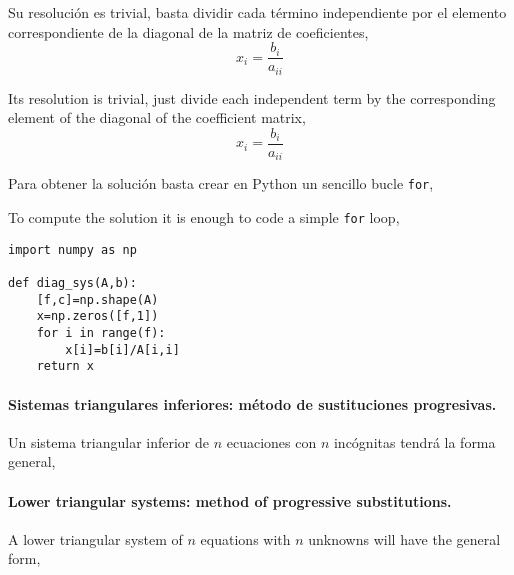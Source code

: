 \begin{paracol}{2}
Su resolución es trivial, basta dividir cada término independiente por el elemento correspondiente de la diagonal de la matriz de coeficientes,
\begin{equation*}
x_i=\frac{b_i}{a_{ii}}
\end{equation*}

\switchcolumn
Its resolution is trivial, just divide each independent term by the corresponding element of the diagonal of the coefficient matrix,
\begin{equation*}
x_i=\frac{b_i}{a_{ii}}
\end{equation*}

\switchcolumn
Para obtener la solución basta crear en Python un sencillo bucle \texttt{for},

\switchcolumn
To compute the solution it is enough to code a simple \texttt{for} loop,
\end{paracol}

\begin{verbatim}
import numpy as np

def diag_sys(A,b):
    [f,c]=np.shape(A)
    x=np.zeros([f,1])
    for i in range(f):
        x[i]=b[i]/A[i,i]
    return x
\end{verbatim}


\begin{paracol}{2}
\paragraph{Sistemas triangulares inferiores: método de sustituciones progresivas.} Un sistema triangular inferior de $n$ ecuaciones con $n$ incógnitas tendrá la forma general,
\switchcolumn
\paragraph{Lower triangular systems: method of progressive substitutions.} A lower triangular system of $n$ equations with $n$ unknowns will have the general form,
\end{paracol}

